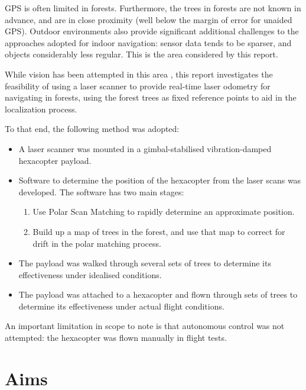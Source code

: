 \documentclass[12pt,oneside,a4paper]{book}
\begin{document}
GPS is often limited in forests. Furthermore, the trees in forests are
not known in advance, and are in close proximity (well below the
margin of error for unaided GPS). Outdoor environments also provide
significant additional challenges to the approaches adopted for indoor
navigation: sensor data tends to be sparser, and objects considerably
less regular. This is the area considered by this report.

While vision has been attempted in this area
\cite{langelaan2005towards}, this report investigates the feasibility
of using a laser scanner to provide real-time laser odometry for
navigating in forests, using the forest trees as fixed reference
points to aid in the localization process.


To that end, the following method was adopted:
\begin{itemize}
\item A laser scanner was mounted in a gimbal-stabilised
  vibration-damped hexacopter payload.
\item Software to determine the position of the hexacopter from the
  laser scans was developed. The software has two main stages:
  \begin{enumerate}
  \item Use Polar Scan Matching to rapidly determine an approximate
    position.
  \item Build up a map of trees in the forest, and use that map to
    correct for drift in the polar matching process.
  \end{enumerate}
\item The payload was walked through several sets of trees to determine
  its effectiveness under idealised conditions.
\item The payload was attached to a hexacopter and flown through sets
  of trees to determine its effectiveness under actual flight conditions.
\end{itemize}

An important limitation in scope to note is that autonomous control
was not attempted: the hexacopter was flown manually in flight tests.
\newpage


\section{Aims}
\label{cha:aims}
\end{document}
